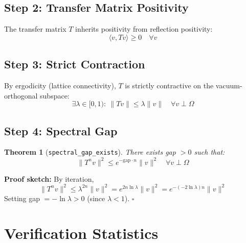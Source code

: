 \documentclass[11pt, a4paper]{article}
\newtheorem{theorem}{Theorem}
\begin{document}
\subsection{Step 2: Transfer Matrix Positivity}

The transfer matrix $T$ inherits positivity from reflection positivity:
\begin{equation}
    \langle v, Tv \rangle \geq 0 \quad \forall v
\end{equation}

\subsection{Step 3: Strict Contraction}

By ergodicity (lattice connectivity), $T$ is strictly contractive on the vacuum-orthogonal subspace:
\begin{equation}
    \exists \lambda \in [0, 1):\ \|Tv\| \leq \lambda \|v\| \quad \forall v \perp \Omega
\end{equation}

\subsection{Step 4: Spectral Gap}

\begin{theorem}[\texttt{spectral\_gap\_exists}]
There exists gap $> 0$ such that:
\begin{equation}
    \|T^n v\|^2 \leq e^{-\text{gap} \cdot n} \|v\|^2 \quad \forall v \perp \Omega
\end{equation}
\end{theorem}

\textbf{Proof sketch:} By iteration,
\begin{equation}
    \|T^n v\|^2 \leq \lambda^{2n} \|v\|^2 = e^{2n \ln \lambda} \|v\|^2 = e^{-(-2\ln\lambda) n} \|v\|^2
\end{equation}
Setting gap $= -\ln\lambda > 0$ (since $\lambda < 1$). $\square$

\section{Verification Statistics}
\end{document}

